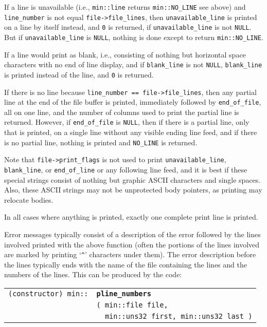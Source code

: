 \documentclass[12pt]{article}
\makeatletter
\newcommand{\ttindex}[1]{\index{#1@{\tt #1}}}
\newcommand{\minindex}[1]{\ttindex{min::#1}\ttindex{#1}}
\newcommand{\EOL}{\penalty \exhyphenpenalty}
\newenvironment{indpar}[1][0.3in]%
	{\begin{list}{}%
		     {\setlength{\itemsep}{0in}%
		      \setlength{\topsep}{0in}%
		      \setlength{\parsep}{1ex}%
		      \setlength{\labelwidth}{#1}%
		      \setlength{\leftmargin}{#1}%
		      \addtolength{\leftmargin}{\labelsep}}%
	 \item}%
	{\end{list}}
\newcommand{\LABEL}[1]{\label{#1}}
\newlength{\ARGBREAKLENGTH}
\newcommand{\ARGBREAK}[1][\ARGBREAKLENGTH]{\\&\hspace*{#1}}
\newcommand{\MINKEY}[1]{{\tt \bf #1}\minindex{#1}}
\makeatother
\begin{document}
If a line is
unavailable (i.e., {\tt min::\EOL line} returns {\tt min::\EOL NO\_\EOL LINE}
see above)
and {\tt line\_\EOL number} is not equal {\tt file->\EOL file\_\EOL lines},
then {\tt unavailable\_\EOL line} is printed on a line by itself instead, and
{\tt 0} is returned, if {\tt unavailable\_\EOL line} is not {\tt NULL}.
But if {\tt unavailable\_\EOL line} is {\tt NULL}, nothing is done except
to return {\tt min::\EOL NO\_\EOL LINE}.

If a line would print as blank, i.e., consisting of
nothing but horizontal space characters with no end of line display, and if
{\tt blank\_\EOL line} is not {\tt NULL},
{\tt blank\_\EOL line} is printed instead of the line, and {\tt 0} is returned.

If there is no line
because {\tt line\_\EOL number == file->\EOL file\_\EOL lines},
then any partial line at the end of the file buffer is printed,
immediately followed by {\tt end\_\EOL of\_\EOL file}, all on one line,
and the number of columns used to print the partial line is returned.
However, if {\tt end\_\EOL of\_\EOL file} is {\tt NULL}, then
if there is a partial line, only that is printed, on a single line
without any visible ending line feed, and if there is no partial line,
nothing is printed and {\tt NO\_\EOL LINE} is returned.

Note that
{\tt file->\EOL print\_\EOL flags} is not used to print
{\tt unavailable\_\EOL line}, {\tt blank\_\EOL line}, or
{\tt end\_\EOL of\_\EOL line} or any following line feed,
and it is best if these special strings consist of nothing but
graphic ASCII characters and single spaces.
Also, these ASCII strings may not be unprotected body pointers,
as printing may relocate bodies.

In all cases where anything is printed, exactly one complete print line is
printed.

Error messages typically consist of a description of the error
followed by the lines involved printed with the above function
(often the portions of the lines involved are marked by printing
`\verb|^|' characters under them).  The error description before
the lines typically ends with the name of the file containing
the lines and the numbers of the lines.  This can be produced
by the code:

\begin{indpar}[1em]\begin{tabular}{r@{}l}
\verb|(constructor) min::| & \MINKEY{pline\_numbers}\ARGBREAK
    \verb|( min::file file,|\ARGBREAK
    \verb|  min::uns32 first, min::uns32 last )|
\LABEL{MIN::PLINE_NUMBERS} \\
\end{tabular}\end{indpar}
\end{document}
